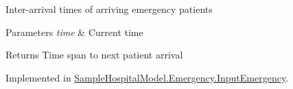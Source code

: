 Inter-\/arrival times of arriving emergency patients 


\begin{DoxyParams}{Parameters}
{\em time} & Current time\\
\hline
\end{DoxyParams}
\begin{DoxyReturn}{Returns}
Time span to next patient arrival
\end{DoxyReturn}


Implemented in \hyperlink{class_sample_hospital_model_1_1_emergency_1_1_input_emergency_ac583cde34f847949fd67ed314a6e6d43}{Sample\+Hospital\+Model.\+Emergency.\+Input\+Emergency}.

